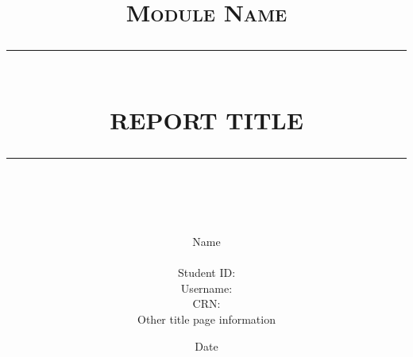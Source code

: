 \documentclass[12pt]{report}
\newcommand{\HRule}[1]{\rule{\linewidth}{#1}}
\begin{document}
	\title{ \normalsize \textsc{Module Name}
		\\ [2.0cm]
		\HRule{0.5pt} \\
		\LARGE \textbf{\uppercase{Report Title}}
		\HRule{2pt} \\ [0.5cm]}	
	\date{Date}
	
	\author{
		Name \\ \\
		Student ID:  \\ 
		Username:  \\
		CRN: \\
		Other title page information
	}

	\maketitle

	\tableofcontents
	\newpage

\begin{abstract}
 \lipsum
\end{abstract}



\end{document}

